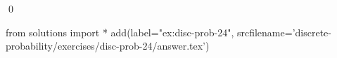 
\begin{ex} 
  \label{ex:disc-prob-24}
  
  \qed
\end{ex} 
\begin{python0}
from solutions import *
add(label="ex:disc-prob-24",
    srcfilename='discrete-probability/exercises/disc-prob-24/answer.tex') 
\end{python0}
